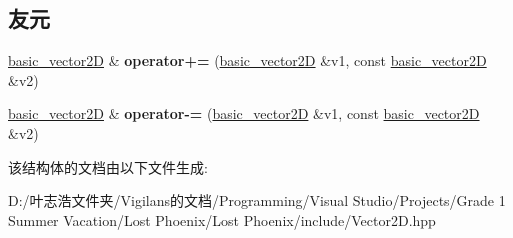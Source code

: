 \subsection*{友元}
\begin{DoxyCompactItemize}
\item 
\mbox{\label{structbasic__vector2_d_adb9aa08ea9517ddbfd6d610e270a1a0e}} 
\hyperlink{structbasic__vector2_d}{basic\+\_\+vector2D} \& {\bfseries operator+=} (\hyperlink{structbasic__vector2_d}{basic\+\_\+vector2D} \&v1, const \hyperlink{structbasic__vector2_d}{basic\+\_\+vector2D} \&v2)
\item 
\mbox{\label{structbasic__vector2_d_a840973b019d576292fcfbb982e351314}} 
\hyperlink{structbasic__vector2_d}{basic\+\_\+vector2D} \& {\bfseries operator-\/=} (\hyperlink{structbasic__vector2_d}{basic\+\_\+vector2D} \&v1, const \hyperlink{structbasic__vector2_d}{basic\+\_\+vector2D} \&v2)
\end{DoxyCompactItemize}


该结构体的文档由以下文件生成\+:\begin{DoxyCompactItemize}
\item 
D\+:/叶志浩文件夹/\+Vigilans的文档/\+Programming/\+Visual Studio/\+Projects/\+Grade 1 Summer Vacation/\+Lost Phoenix/\+Lost Phoenix/include/Vector2\+D.\+hpp\end{DoxyCompactItemize}
